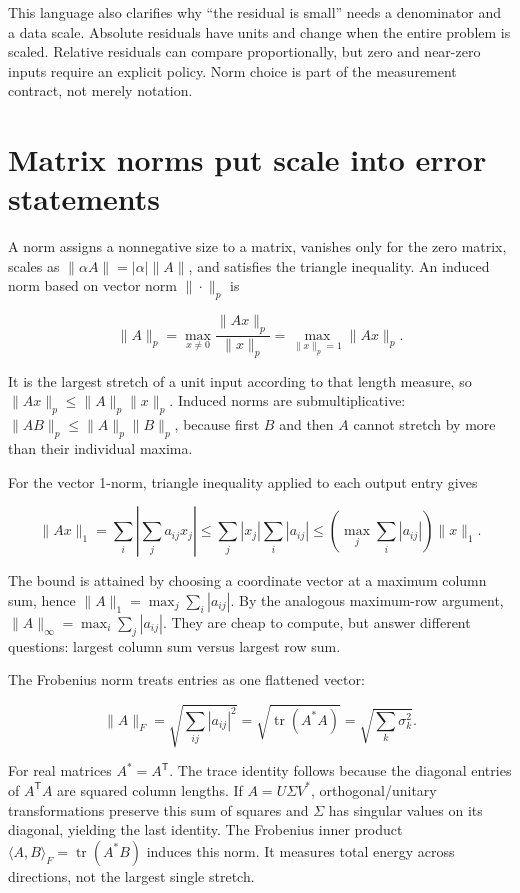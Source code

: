 This language also clarifies why ``the residual is small'' needs a denominator and a data scale. Absolute residuals have units and change when the entire problem is scaled. Relative residuals can compare proportionally, but zero and near-zero inputs require an explicit policy. Norm choice is part of the measurement contract, not merely notation.

\section{Matrix norms put scale into error statements}\label{01-foundations-i-ch019-matrix-norms-put-scale-into-error-statements}

A norm assigns a nonnegative size to a matrix, vanishes only for the zero matrix, scales as \(\|\alpha A\|=|\alpha|\|A\|\), and satisfies the triangle inequality. An induced norm based on vector norm \(\|\cdot\|_p\) is

\[
\|A\|_p=\max_{x\ne0}\frac{\|Ax\|_p}{\|x\|_p}
=\max_{\|x\|_p=1}\|Ax\|_p.
\]

It is the largest stretch of a unit input according to that length measure, so \(\|Ax\|_p\le\|A\|_p\|x\|_p\). Induced norms are submultiplicative: \(\|AB\|_p\le\|A\|_p\|B\|_p\), because first \(B\) and then \(A\) cannot stretch by more than their individual maxima.

For the vector 1-norm, triangle inequality applied to each output entry gives

\[
\|Ax\|_1=\sum_i\left|\sum_j a_{ij}x_j\right|
\le\sum_j |x_j|\sum_i|a_{ij}|
\le \left(\max_j\sum_i|a_{ij}|\right)\|x\|_1.
\]

The bound is attained by choosing a coordinate vector at a maximum column sum, hence \(\|A\|_1=\max_j\sum_i|a_{ij}|\). By the analogous maximum-row argument, \(\|A\|_\infty=\max_i\sum_j|a_{ij}|\). They are cheap to compute, but answer different questions: largest column sum versus largest row sum.

The Frobenius norm treats entries as one flattened vector:

\[
\|A\|_F=\sqrt{\sum_{ij}|a_{ij}|^2}
=\sqrt{\operatorname{tr}(A^*A)}
=\sqrt{\sum_k\sigma_k^2}.
\]

For real matrices \(A^*=A^\mathsf T\). The trace identity follows because the diagonal entries of \(A^\mathsf TA\) are squared column lengths. If \(A=U\Sigma V^*\), orthogonal/unitary transformations preserve this sum of squares and \(\Sigma\) has singular values on its diagonal, yielding the last identity. The Frobenius inner product \(\langle A,B\rangle_F=\operatorname{tr}(A^*B)\) induces this norm. It measures total energy across directions, not the largest single stretch.

